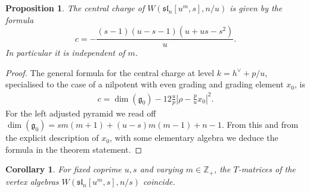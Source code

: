 \documentclass[12pt]{amsart}
\theoremstyle{plain}
\newtheorem{prop}[thm]{Proposition}
\newtheorem{cor}[thm]{Corollary}
\theoremstyle{definition}
\numberwithin{equation}{section}
\newcommand{\Z}{\mathbb{Z}}
\newcommand{\g}{\mathfrak{g}}
\newcommand{\sll}{\mathfrak{sl}}
\begin{document}
\begin{prop}\label{prop:c.formula}
The central charge of $W(\sll_n[u^m, s], n/u)$ is given by the formula
\[
c = - \frac{(s-1)(u-s-1)(u+us-s^2)}{u}.
\]
In particular it is independent of $m$.
\end{prop}

\begin{proof}
The general formula for the central charge {\cite[Theorem 2.2]{KRW03}} at level $k = h^\vee + p/u$, specialised to the case of a nilpotent with even grading and grading element $x_0$, is
\begin{align}\label{eq:c.formula.general}
c = \dim(\g_0) - 12 \frac{u}{p} \left|\rho - \frac{p}{u}x_0\right|^2.
\end{align}
For the left adjusted pyramid we read off $\dim(\g_0) = sm(m+1) + (u-s)m(m-1) + n-1$. From this and from the explicit description of $x_0$, with some elementary algebra we deduce the formula in the theorem statement.
\end{proof}

\begin{cor}
For fixed coprime $u, s$ and varying $m \in \Z_+$, the $T$-matrices of the vertex algebras $W(\sll_n[u^m, s], n/s)$ coincide.
\end{cor}
\end{document}
